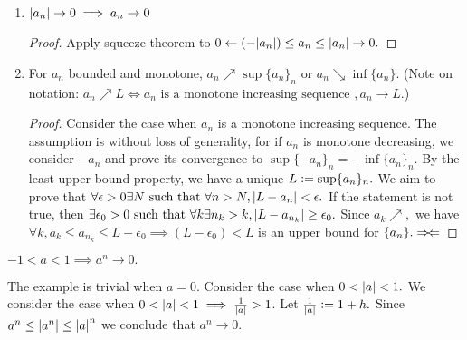 \begin{enumerate}
\begin{proof}
        Allowing $\epsilon_a=\epsilon\sqrt[k]{a^{k-1}}$ completes the proof.
    \end{proof}
    
    \item $\abs{a_n}\rightarrow 0\implies a_n\rightarrow 0$
    \begin{proof}
        Apply squeeze theorem to $0\leftarrow(-\abs{a_n})\leq a_n \leq \abs{a_n}\rightarrow 0.$
    \end{proof}
    
    \item
    \begin{theorem}
    For $a_n$ bounded and monotone, $a_n\nearrow\sup\{a_n\}_n$ or $a_n\searrow\inf\{a_n\}$. (Note on notation: $a_n\nearrow L \iff a_n \text{ is a monotone increasing sequence }, a_n\rightarrow L.$)
    \end{theorem}
    \begin{proof}
        Consider the case when $a_n$ is a monotone increasing sequence. The assumption is without loss of generality, for if $a_n$ is monotone decreasing, we consider $-a_n$ and prove its convergence to $\sup\{-a_n\}_n=-\inf\{a_n\}_n.$ By the least upper bound property, we have a unique $L\mathrel{\mathop:}=\sup\{a_n\}_n.$ We aim to prove that $\forall\epsilon>0\exists N\text{ such that }\forall n>N,\abs{L-a_n}<\epsilon.$ If the statement is not true, then $\exists\epsilon_0>0\text{ such that }\forall k\exists n_k>k,\abs{L-a_{n_k}}\geq\epsilon_0.$ Since $a_k\nearrow,$ we have $\forall k, a_k\leq a_{n_k}\leq L-\epsilon_0\implies (L-\epsilon_0)<L$ is an upper bound for $\{a_n\}.\Rightarrow\!\Leftarrow$
    \end{proof}
    
\end{enumerate}

\begin{example}
    $-1<a<1\implies a^n\rightarrow0.$
    
    The example is trivial when $a=0$. Consider the case when $0<\abs{a}<1.$ We consider the case when $0<\abs{a}<1\implies\frac{1}{\abs{a}}> 1$. Let $\frac{1}{\abs{a}}\mathrel{\mathop:}= 1+h.$
    Since $a^n \leq \abs{a^n} \leq \abs{a}^n$ we conclude that $a^n\rightarrow 0.$
\end{example}

